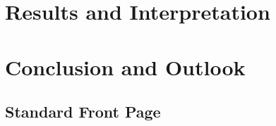 \documentclass[pnumromarab,noindentfirst]{abnt}
\begin{document}
\part{Results and Interpretation}\label{par:results}



\part{Conclusion and Outlook}\label{par:conclusions}



\makeatletter
\renewcommand\@biblabel[1]{{\parbox{0.8cm}{[#1]}}}
\makeatother




\annex

\chapter{Standard Front Page}\label{ann:front-page}



\appendix




\end{document}
